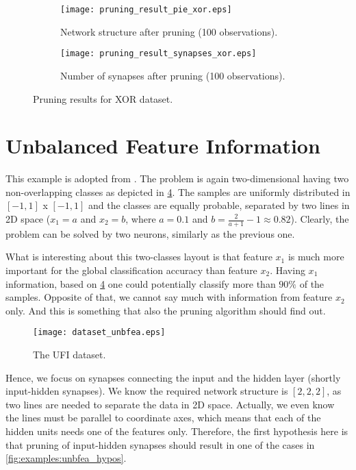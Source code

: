 \begin{figure}[H]
\centering
\begin{subfigure}{.4\textwidth}
  \centering
  \texttt{[image: pruning\_result\_pie\_xor.eps]}
  \caption{Network structure after pruning (100 observations).}
  \label{fig:examples:pie_xor}
\end{subfigure}
\begin{subfigure}{.4\textwidth}
  \centering
  \texttt{[image: pruning\_result\_synapses\_xor.eps]}
  \caption{Number of synapses after pruning (100 observations).}
  \label{fig:examples:result_synapses_xor}
\end{subfigure}
\caption{Pruning results for XOR dataset.}
\label{fig:examples:pruning_result_xor}
\end{figure}

\section{Unbalanced Feature Information} \label{sec:example_ufi}
This example is adopted from \citep{karnin:pa}. The problem is again two-dimensional having two non-overlapping classes as depicted in \cref{fig:examples:dataset_unbfea}. The samples are uniformly distributed in $ [-1, 1] $ x $ [-1, 1] $ and the classes are equally probable, separated by two lines in 2D space ($ x_1 = a $ and $ x_2 = b $, where $ a = 0.1 $ and $ b = \frac{2}{a+1} - 1 \approx 0.82 $). Clearly, the problem can be solved by two neurons, similarly as the previous one.

What is interesting about this two-classes layout is that feature $ x_1 $ is much more important for the global classification accuracy than feature $ x_2 $. Having $ x_1 $ information, based on \cref{fig:examples:dataset_unbfea} one could potentially classify more than $ 90\% $ of the samples. Opposite of that, we cannot say much with information from feature $ x_2 $ only. And this is something that also the pruning algorithm should find out.

\begin{figure}[H]
\centering
\texttt{[image: dataset\_unbfea.eps]}
\caption{The UFI dataset.}
\label{fig:examples:dataset_unbfea}
\end{figure}

Hence, we focus on synapses connecting the input and the hidden layer (shortly input-hidden synapses). We know the required network structure is $ [2, 2, 2] $, as two lines are needed to separate the data in 2D space. Actually, we even know the lines must be parallel to coordinate axes, which means that each of the hidden units needs one of the features only. Therefore, the first hypothesis here is that pruning of input-hidden synapses should result in one of the cases in \cref{fig:examples:unbfea_hypos}.

